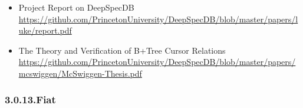 \documentclass[12pt,twoside]{article}
\begin{document}
\begin{itemize}[noitemsep,topsep=\mdcompacttopsep]
\begin{itemize}[noitemsep,topsep=\mdcompacttopsep]
\item{}Project Report on DeepSpecDB
\href{https://github.com/PrincetonUniversity/DeepSpecDB/blob/master/papers/luke/report.pdf}{{\ttfamily https://\hspace{0pt}github.\hspace{0pt}com/\hspace{0pt}PrincetonUniversity/\hspace{0pt}DeepSpecDB/\hspace{0pt}blob/\hspace{0pt}master/\hspace{0pt}papers/\hspace{0pt}luke/\hspace{0pt}report.\hspace{0pt}pdf}}%

\item{}The Theory and Verification of B+Tree Cursor Relations
\href{https://github.com/PrincetonUniversity/DeepSpecDB/blob/master/papers/mcswiggen/McSwiggen-Thesis.pdf}{{\ttfamily https://\hspace{0pt}github.\hspace{0pt}com/\hspace{0pt}PrincetonUniversity/\hspace{0pt}DeepSpecDB/\hspace{0pt}blob/\hspace{0pt}master/\hspace{0pt}papers/\hspace{0pt}mcswiggen/\hspace{0pt}McSwiggen-\hspace{0pt}Thesis.\hspace{0pt}pdf}}%
\end{itemize}%
\end{itemize}%

\subsubsection{3.0.13.\hspace*{0.5em}Fiat}\label{sec-fiat}%
\end{document}
